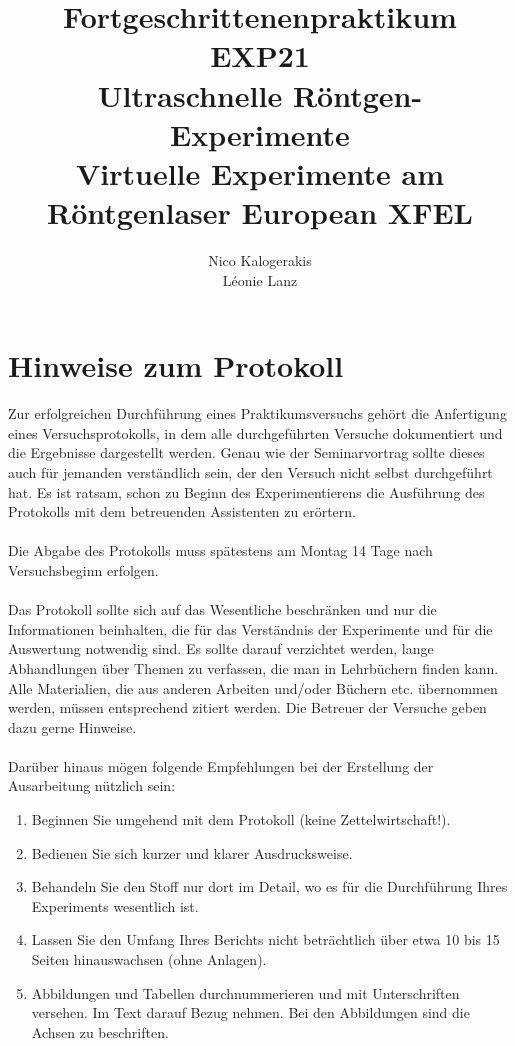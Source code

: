 \documentclass[10pt,a4paper]{article}
\begin{document}

\title{Fortgeschrittenenpraktikum\\ EXP21\\ Ultraschnelle Röntgen-Experimente \\ Virtuelle Experimente am Röntgenlaser European XFEL }
\author{Nico Kalogerakis \\ Léonie Lanz}

\maketitle
\newpage

\tableofcontents
\vfill
\newpage


\section{Hinweise zum Protokoll}

Zur erfolgreichen Durchführung eines Praktikumsversuchs gehört die Anfertigung eines Versuchsprotokolls, in dem alle durchgeführten Versuche dokumentiert und die Ergebnisse dargestellt werden. Genau wie der Seminarvortrag sollte dieses auch für jemanden verständlich sein, der den Versuch nicht selbst durchgeführt hat. Es ist ratsam, schon zu Beginn des Experimentierens die Ausführung des Protokolls mit dem betreuenden Assistenten zu erörtern.\\
\\
Die Abgabe des Protokolls muss spätestens am Montag 14 Tage nach Versuchsbeginn erfolgen.\\
\\
Das Protokoll sollte sich auf das Wesentliche beschränken und nur die Informationen beinhalten, die für das Verständnis der Experimente und für die Auswertung notwendig sind. Es sollte darauf verzichtet werden, lange Abhandlungen über Themen zu verfassen, die man in Lehrbüchern finden kann. Alle Materialien, die aus anderen Arbeiten und/oder Büchern etc. übernommen werden, müssen entsprechend zitiert werden. Die Betreuer der Versuche geben dazu gerne Hinweise.\\
\\
Darüber hinaus mögen folgende Empfehlungen bei der Erstellung der Ausarbeitung nützlich sein:\\
\begin{enumerate}
\item Beginnen Sie umgehend mit dem Protokoll (keine Zettelwirtschaft!).
\item Bedienen Sie sich kurzer und klarer Ausdrucksweise.
\item Behandeln Sie den Stoff nur dort im Detail, wo es für die Durchführung Ihres Experiments wesentlich ist.
\item Lassen Sie den Umfang Ihres Berichts nicht beträchtlich über etwa 10 bis 15 Seiten hinauswachsen (ohne Anlagen).
\item Abbildungen und Tabellen durchnummerieren und mit Unterschriften versehen. Im Text darauf Bezug nehmen. Bei den Abbildungen sind die Achsen zu beschriften. 
\end{enumerate}
\end{document}

